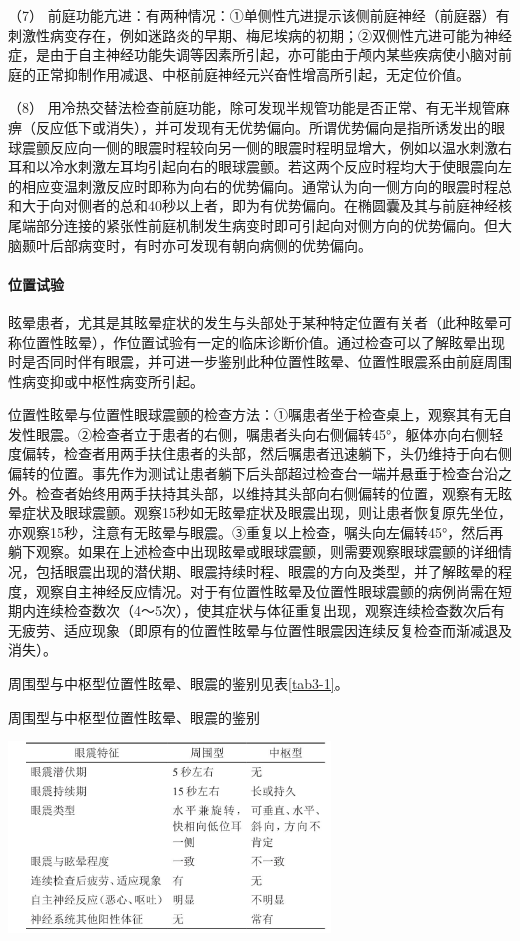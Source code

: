 （7）
前庭功能亢进：有两种情况：①单侧性亢进提示该侧前庭神经（前庭器）有刺激性病变存在，例如迷路炎的早期、梅尼埃病的初期；②双侧性亢进可能为神经症，是由于自主神经功能失调等因素所引起，亦可能由于颅内某些疾病使小脑对前庭的正常抑制作用减退、中枢前庭神经元兴奋性增高所引起，无定位价值。

（8）
用冷热交替法检查前庭功能，除可发现半规管功能是否正常、有无半规管麻痹（反应低下或消失），并可发现有无优势偏向。所谓优势偏向是指所诱发出的眼球震颤反应向一侧的眼震时程较向另一侧的眼震时程明显增大，例如以温水刺激右耳和以冷水刺激左耳均引起向右的眼球震颤。若这两个反应时程均大于使眼震向左的相应变温刺激反应时即称为向右的优势偏向。通常认为向一侧方向的眼震时程总和大于向对侧者的总和40秒以上者，即为有优势偏向。在椭圆囊及其与前庭神经核尾端部分连接的紧张性前庭机制发生病变时即可引起向对侧方向的优势偏向。但大脑颞叶后部病变时，有时亦可发现有朝向病侧的优势偏向。

\paragraph{位置试验}

眩晕患者，尤其是其眩晕症状的发生与头部处于某种特定位置有关者（此种眩晕可称位置性眩晕），作位置试验有一定的临床诊断价值。通过检查可以了解眩晕出现时是否同时伴有眼震，并可进一步鉴别此种位置性眩晕、位置性眼震系由前庭周围性病变抑或中枢性病变所引起。

位置性眩晕与位置性眼球震颤的检查方法：①嘱患者坐于检查桌上，观察其有无自发性眼震。②检查者立于患者的右侧，嘱患者头向右侧偏转45°，躯体亦向右侧轻度偏转，检查者用两手扶住患者的头部，然后嘱患者迅速躺下，头仍维持于向右侧偏转的位置。事先作为测试让患者躺下后头部超过检查台一端并悬垂于检查台沿之外。检查者始终用两手扶持其头部，以维持其头部向右侧偏转的位置，观察有无眩晕症状及眼球震颤。观察15秒如无眩晕症状及眼震出现，则让患者恢复原先坐位，亦观察15秒，注意有无眩晕与眼震。③重复以上检查，嘱头向左偏转45°，然后再躺下观察。如果在上述检查中出现眩晕或眼球震颤，则需要观察眼球震颤的详细情况，包括眼震出现的潜伏期、眼震持续时程、眼震的方向及类型，并了解眩晕的程度，观察自主神经反应情况。对于有位置性眩晕及位置性眼球震颤的病例尚需在短期内连续检查数次（4～5次），使其症状与体征重复出现，观察连续检查数次后有无疲劳、适应现象（即原有的位置性眩晕与位置性眼震因连续反复检查而渐减退及消失）。

周围型与中枢型位置性眩晕、眼震的鉴别见表\ref{tab3-1}。

\begin{table}[htbp]
\centering
\caption{周围型与中枢型位置性眩晕、眼震的鉴别}
\label{tab3-1}
\includegraphics[width=3.36458in,height=2in]{./images/Image00008.jpg}
\end{table}

